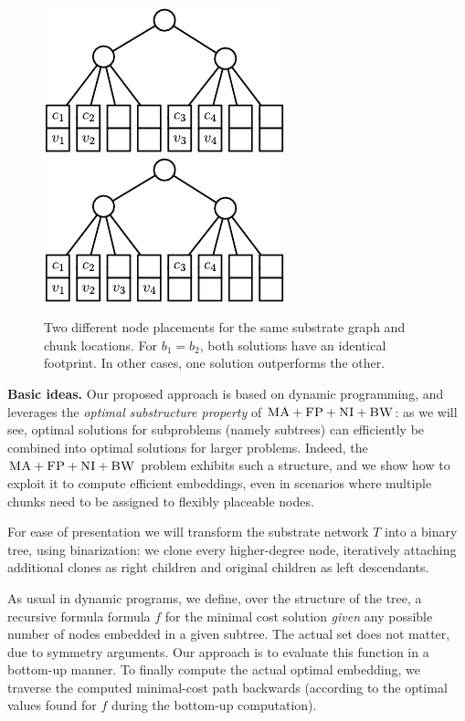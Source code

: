 \documentclass[conference,10pt]{IEEEtran}
\newcommand{\CC}{\textsc{NI}}
\newcommand{\FP}{\textsc{FP}}
\newcommand{\BW}{\textsc{BW}}
\newcommand{\MA}{\textsc{MA}}
\newcommand{\Tree}{\ensuremath{T}}
\newcommand{\CostTrans}{\ensuremath{b_1}}
\newcommand{\CostCom}{\ensuremath{b_2}}
\begin{document}
\begin{figure}
\includegraphics[width = 0.49\columnwidth]{figs/dynamic_bad}
\hfill
\includegraphics[width = 0.49\columnwidth]{figs/dynamic_good}
\caption{Two different node placements for the same substrate graph and chunk
locations. For $\CostTrans = \CostCom$, both solutions have an identical
footprint. In other cases, one solution outperforms the other.}
\label{fig:dynamic_motivation}
\vspace{-1em}
\end{figure}



\textbf{Basic ideas.} Our proposed approach is based on dynamic programming, and
leverages the \emph{optimal substructure property} of $\MA+\FP+\CC+\BW$:
as we will see, optimal solutions for subproblems (namely subtrees)
can efficiently be combined into optimal solutions for larger problems.
Indeed, the $\MA+\FP+\CC+\BW$ problem
exhibits such a structure, and we show how to exploit it to
compute efficient embeddings, even in scenarios where multiple chunks
need to be assigned to flexibly placeable nodes.

For ease of presentation we will transform the
substrate network $\Tree$
into a binary tree, using binarization:
we clone every higher-degree node,
iteratively attaching additional clones as right children
and original children as left descendants.

As usual in dynamic programs, we define, over the structure of the tree, a
recursive formula formula $f$ for
the minimal cost solution \emph{given} any possible number of nodes
embedded in a given subtree. The actual set does not matter,
due to symmetry arguments.
Our approach is to evaluate this function in a bottom-up
manner.
To finally compute the actual optimal embedding,
we traverse the computed minimal-cost path backwards
(according to
the optimal values found for $f$ during the bottom-up computation).
\end{document}
